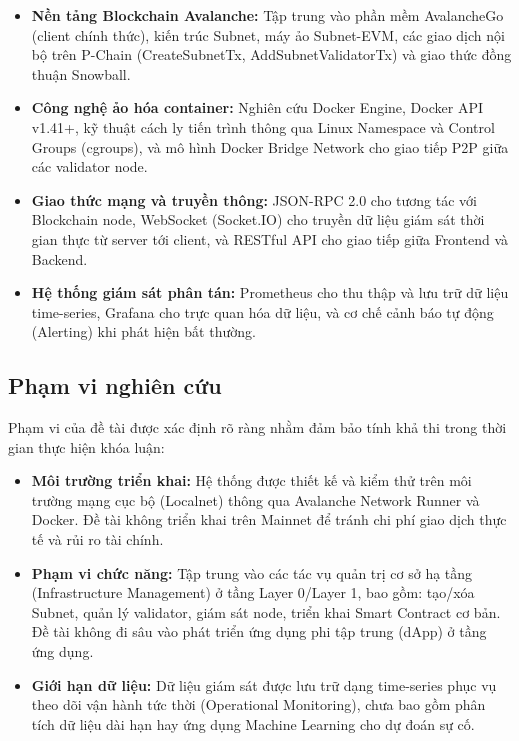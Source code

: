 \begin{itemize}
    \item \textbf{Nền tảng Blockchain Avalanche:} Tập trung vào phần mềm AvalancheGo (client chính thức), kiến trúc Subnet, máy ảo Subnet-EVM, các giao dịch nội bộ trên P-Chain (CreateSubnetTx, AddSubnetValidatorTx) và giao thức đồng thuận Snowball.

    \item \textbf{Công nghệ ảo hóa container:} Nghiên cứu Docker Engine, Docker API v1.41+, kỹ thuật cách ly tiến trình thông qua Linux Namespace và Control Groups (cgroups), và mô hình Docker Bridge Network cho giao tiếp P2P giữa các validator node.

    \item \textbf{Giao thức mạng và truyền thông:} JSON-RPC 2.0 cho tương tác với Blockchain node, WebSocket (Socket.IO) cho truyền dữ liệu giám sát thời gian thực từ server tới client, và RESTful API cho giao tiếp giữa Frontend và Backend.

    \item \textbf{Hệ thống giám sát phân tán:} Prometheus cho thu thập và lưu trữ dữ liệu time-series, Grafana cho trực quan hóa dữ liệu, và cơ chế cảnh báo tự động (Alerting) khi phát hiện bất thường.
\end{itemize}

\subsection{Phạm vi nghiên cứu}

Phạm vi của đề tài được xác định rõ ràng nhằm đảm bảo tính khả thi trong thời gian thực hiện khóa luận:

\begin{itemize}
    \item \textbf{Môi trường triển khai:} Hệ thống được thiết kế và kiểm thử trên môi trường mạng cục bộ (Localnet) thông qua Avalanche Network Runner và Docker. Đề tài không triển khai trên Mainnet để tránh chi phí giao dịch thực tế và rủi ro tài chính.

    \item \textbf{Phạm vi chức năng:} Tập trung vào các tác vụ quản trị cơ sở hạ tầng (Infrastructure Management) ở tầng Layer 0/Layer 1, bao gồm: tạo/xóa Subnet, quản lý validator, giám sát node, triển khai Smart Contract cơ bản. Đề tài không đi sâu vào phát triển ứng dụng phi tập trung (dApp) ở tầng ứng dụng.

    \item \textbf{Giới hạn dữ liệu:} Dữ liệu giám sát được lưu trữ dạng time-series phục vụ theo dõi vận hành tức thời (Operational Monitoring), chưa bao gồm phân tích dữ liệu dài hạn hay ứng dụng Machine Learning cho dự đoán sự cố.
\end{itemize}

